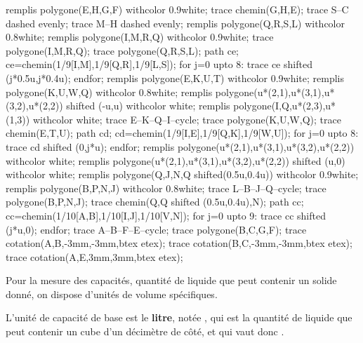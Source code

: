 \begin{remarque}
\begin{minipage}{0.4\linewidth}
\begin{center}
\begin{Geometrie}[CoinBG={(-0.5u,-0.5u)}]
                remplis polygone(E,H,G,F) withcolor 0.9white;
                trace chemin(G,H,E);
                trace S--C dashed evenly;
                trace M--H dashed evenly;
                remplis polygone(Q,R,S,L) withcolor 0.8white;
                remplis polygone(I,M,R,Q) withcolor 0.9white;
                trace polygone(I,M,R,Q);
                trace polygone(Q,R,S,L);
                path ce;
                ce=chemin(1/9[I,M],1/9[Q,R],1/9[L,S]);
                for j=0 upto 8:
                trace ce shifted (j*0.5u,j*0.4u);
                endfor;
                remplis polygone(E,K,U,T) withcolor 0.9white;
                remplis polygone(K,U,W,Q) withcolor 0.8white;
                remplis polygone(u*(2,1),u*(3,1),u*(3,2),u*(2,2)) shifted (-u,u) withcolor white;
                remplis polygone(I,Q,u*(2,3),u*(1,3)) withcolor white;
                trace E--K--Q--I--cycle;
                trace polygone(K,U,W,Q);
                trace chemin(E,T,U);
                path cd;
                cd=chemin(1/9[I,E],1/9[Q,K],1/9[W,U]);
                for j=0 upto 8:
                trace cd shifted (0,j*u);
                endfor;
                remplis polygone(u*(2,1),u*(3,1),u*(3,2),u*(2,2)) withcolor white;
                remplis polygone(u*(2,1),u*(3,1),u*(3,2),u*(2,2)) shifted (u,0) withcolor white;
                remplis polygone(Q,J,N,Q shifted(0.5u,0.4u)) withcolor 0.9white;
                remplis polygone(B,P,N,J) withcolor 0.8white;
                trace L--B--J--Q--cycle;
                trace polygone(B,P,N,J);
                trace chemin(Q,Q shifted (0.5u,0.4u),N);
                path cc;
                cc=chemin(1/10[A,B],1/10[I,J],1/10[V,N]);
                for j=0 upto 9:
                trace cc shifted (j*u,0);
                endfor;
                trace A--B--F--E--cycle;
                trace polygone(B,C,G,F);
                trace cotation(A,B,-3mm,-3mm,btex  etex);
                trace cotation(B,C,-3mm,-3mm,btex  etex);
                trace cotation(A,E,3mm,3mm,btex  etex);
            \end{Geometrie}
        \end{center}
    \end{minipage}
\end{remarque}

\begin{definition}
    Pour la mesure des capacités, quantité de liquide que peut contenir un solide donné, on dispose d'unités de volume spécifiques.
    
    L'unité de capacité de base est le \textbf{litre}, notée \Capa[L]{}, qui est la quantité de liquide que peut contenir un cube d'un décimètre de côté, et qui vaut donc .
\end{definition}

